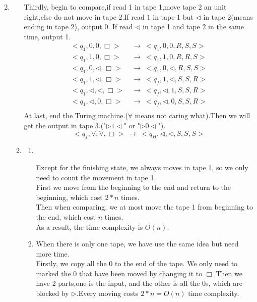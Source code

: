\documentclass[12pt,a4paper]{article}
\makeatletter
\newtheorem*{solution}{Solution}
\theoremstyle{definition}
\renewenvironment{solution}[1][Solution] {\par\pushQED{\qed}\normalfont\topsep6\p@\@plus6\p@\relax\trivlist\item[\hskip\labelsep\bfseries#1\@addpunct{.}]\ignorespaces}{\popQED\endtrivlist\@endpefalse} \makeatother
\makeatother
\begin{document}
\begin{enumerate}
\begin{solution}
\begin{enumerate}
        Thirdly, begin to compare,if read 1 in tape 1,move tape 2 an unit right,else do not move in tape 2.If read $1$ in tape 1 but $\triangleleft$ in tape 2(means ending in tape 2), output 0.
        If read $\triangleleft$ in tape 1 and tape 2 in the same time, output 1.
        \begin{equation}
            \begin{aligned}
            <q_1,0,0,\Box> ~&\rightarrow~ <q_1,0,0,R,S,S>\\
            <q_1,1,0,\Box> ~&\rightarrow~ <q_1,1,0,R,R,S>\\
            <q_1,0,\triangleleft,\Box> ~&\rightarrow~ <q_1,0,\triangleleft,R,S,S>\\
            <q_1,1,\triangleleft,\Box> ~&\rightarrow~ <q_f,1,\triangleleft,S,S,R>\\
            <q_1,\triangleleft,\triangleleft,\Box> ~&\rightarrow~ <q_f,\triangleleft,1,S,S,R>\\
            <q_1,\triangleleft,0,\Box> ~&\rightarrow~ <q_f,\triangleleft,0,S,S,R>\\
            \end{aligned}
        \end{equation}
        At last, end the Turing machine.($\forall$ means not caring what).Then we will get the output in tape 3.("$\triangleright 1\triangleleft$" or "$\triangleright 0\triangleleft$").
        \begin{equation}
            <q_f,\forall,\forall,\Box> ~\rightarrow~<q_H,\triangleleft,\triangleleft,S,S,S>
        \end{equation}
        \item
        \begin{enumerate}
            \item ~\par
            Except for the finishing state, we always moves in tape 1, so we only need to count the movement in tape 1.\\
        First we move from the beginning to the end and return to the beginning, which cost $2*n$ times.\\
        Then when comparing, we at most move the tape 1 from beginning to the end, which cost $n$ times.\\
        As a result, the time complexity is $O(n)$.
        \item 
        When there is only one tape, we have use the same idea but need more time.\\
        Firstly, we copy all the 0 to the end of the tape. We only need to marked the 0 that have been moved by changing it to $\Box$.Then we have 2 parts,one is the input, and the other is all the 0s, which are blocked by $\triangleright$.Every moving costs $2*n=O(n)$ time complexity.\\

\end{enumerate}
\end{enumerate}
\end{solution}
\end{enumerate}
\end{document}
